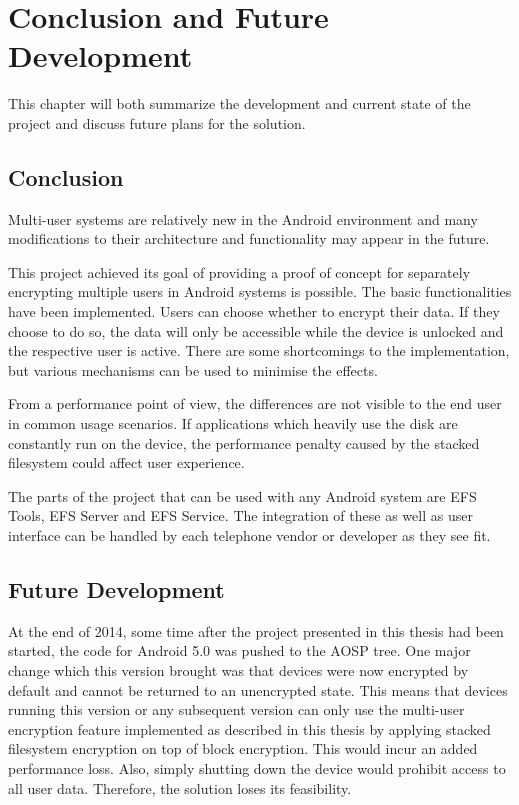 \chapter{Conclusion and Future Development}
\label{chapter:conclusion-devel}

This chapter will both summarize the development and current state of the project and discuss future plans for the solution.

\section{Conclusion}
\label{sec:conclusion}

Multi-user systems are relatively new in the Android environment and many modifications to their architecture and functionality may appear in the future.

This project achieved its goal of providing a proof of concept for separately encrypting multiple users in Android systems is possible. The basic functionalities have been implemented. Users can choose whether to encrypt their data. If they choose to do so, the data will only be accessible while the device is unlocked and the respective user is active. There are some shortcomings to the implementation, but various mechanisms can be used to minimise the effects.

From a performance point of view, the differences are not visible to the end user in common usage scenarios. If applications which heavily use the disk are constantly run on the device, the performance penalty caused by the stacked filesystem could affect user experience.

The parts of the project that can be used with any Android system are EFS Tools, EFS Server and EFS Service. The integration of these as well as user interface can be handled by each telephone vendor or developer as they see fit.

\section{Future Development}
\label{sec:future-devel}

At the end of 2014, some time after the project presented in this thesis had been started, the code for Android 5.0 was pushed to the AOSP tree. One major change which this version brought was that devices were now encrypted by default and cannot be returned to an unencrypted state\cite{andr-enc}. This means that devices running this version or any subsequent version can only use the multi-user encryption feature implemented as described in this thesis by applying stacked filesystem encryption on top of block encryption. This would incur an added performance loss. Also, simply shutting down the device would prohibit access to all user data. Therefore, the solution loses its feasibility.

